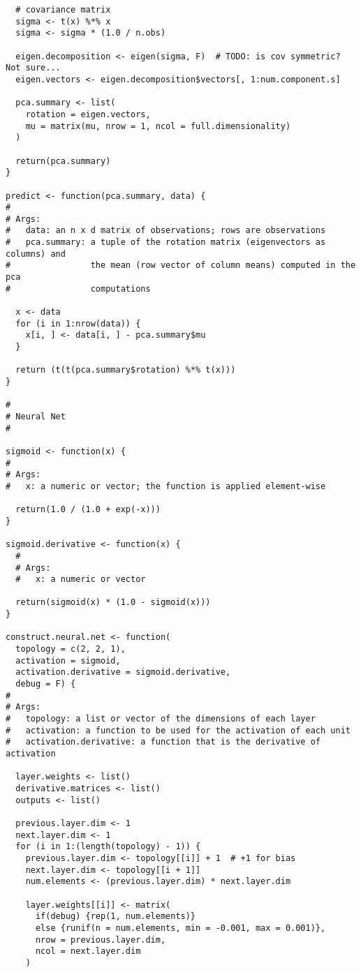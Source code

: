 \documentclass{article}
\begin{document}
\begin{verbatim}
  # covariance matrix
  sigma <- t(x) %*% x
  sigma <- sigma * (1.0 / n.obs)

  eigen.decomposition <- eigen(sigma, F)  # TODO: is cov symmetric? Not sure...
  eigen.vectors <- eigen.decomposition$vectors[, 1:num.component.s]

  pca.summary <- list(
    rotation = eigen.vectors,
    mu = matrix(mu, nrow = 1, ncol = full.dimensionality)
  )

  return(pca.summary)
}

predict <- function(pca.summary, data) {
#
# Args:
#   data: an n x d matrix of observations; rows are observations
#   pca.summary: a tuple of the rotation matrix (eigenvectors as columns) and
#                the mean (row vector of column means) computed in the pca
#                computations

  x <- data
  for (i in 1:nrow(data)) {
    x[i, ] <- data[i, ] - pca.summary$mu
  }

  return (t(t(pca.summary$rotation) %*% t(x)))
}

#
# Neural Net
#

sigmoid <- function(x) {
#
# Args:
#   x: a numeric or vector; the function is applied element-wise

  return(1.0 / (1.0 + exp(-x)))
}

sigmoid.derivative <- function(x) {
  #
  # Args:
  #   x: a numeric or vector

  return(sigmoid(x) * (1.0 - sigmoid(x)))
}

construct.neural.net <- function(
  topology = c(2, 2, 1),
  activation = sigmoid,
  activation.derivative = sigmoid.derivative,
  debug = F) {
#
# Args:
#   topology: a list or vector of the dimensions of each layer
#   activation: a function to be used for the activation of each unit
#   activation.derivative: a function that is the derivative of activation

  layer.weights <- list()
  derivative.matrices <- list()
  outputs <- list()

  previous.layer.dim <- 1
  next.layer.dim <- 1
  for (i in 1:(length(topology) - 1)) {
    previous.layer.dim <- topology[[i]] + 1  # +1 for bias
    next.layer.dim <- topology[[i + 1]]
    num.elements <- (previous.layer.dim) * next.layer.dim

    layer.weights[[i]] <- matrix(
      if(debug) {rep(1, num.elements)}
      else {runif(n = num.elements, min = -0.001, max = 0.001)},
      nrow = previous.layer.dim,
      ncol = next.layer.dim
    )


\end{verbatim}
\end{document}
